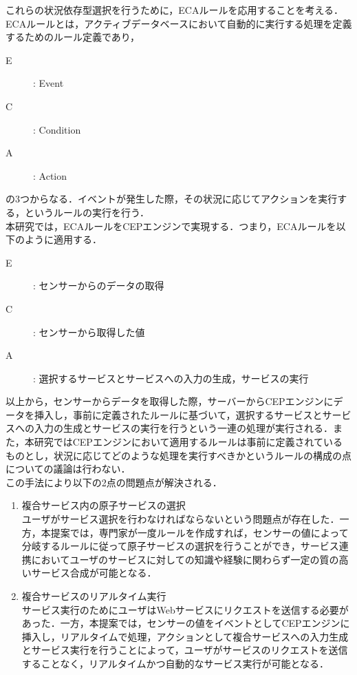 \documentclass{kuisthesis}			%
\begin{document}
これらの状況依存型選択を行うために，ECAルールを応用することを考える．ECAルールとは，アクティブデータベースにおいて自動的に実行する処理を定義するためのルール定義であり，
\begin{description}
\item[E] : Event
\item[C] : Condition
\item[A] : Action
\end{description}
の3つからなる．イベントが発生した際，その状況に応じてアクションを実行する，というルールの実行を行う．\\
本研究では，ECAルールをCEPエンジンで実現する．つまり，ECAルールを以下のように適用する．
\begin{description}
\item[E] : センサーからのデータの取得
\item[C] : センサーから取得した値
\item[A] : 選択するサービスとサービスへの入力の生成，サービスの実行
\end{description}
以上から，センサーからデータを取得した際，サーバーからCEPエンジンにデータを挿入し，事前に定義されたルールに基づいて，選択するサービスとサービスへの入力の生成とサービスの実行を行うという一連の処理が実行される．また，本研究ではCEPエンジンにおいて適用するルールは事前に定義されているものとし，状況に応じてどのような処理を実行すべきかというルールの構成の点についての議論は行わない．\\
この手法により以下の2点の問題点が解決される．%

\begin{enumerate}
\item 複合サービス内の原子サービスの選択\\
ユーザがサービス選択を行わなければならないという問題点が存在した．一方，本提案では，専門家が一度ルールを作成すれば，センサーの値によって分岐するルールに従って原子サービスの選択を行うことができ，サービス連携においてユーザのサービスに対しての知識や経験に関わらず一定の質の高いサービス合成が可能となる．
\item 複合サービスのリアルタイム実行\\
サービス実行のためにユーザはWebサービスにリクエストを送信する必要があった．一方，本提案では，センサーの値をイベントとしてCEPエンジンに挿入し，リアルタイムで処理，アクションとして複合サービスへの入力生成とサービス実行を行うことによって，ユーザがサービスのリクエストを送信することなく，リアルタイムかつ自動的なサービス実行が可能となる．
\end{enumerate}
\end{document}
